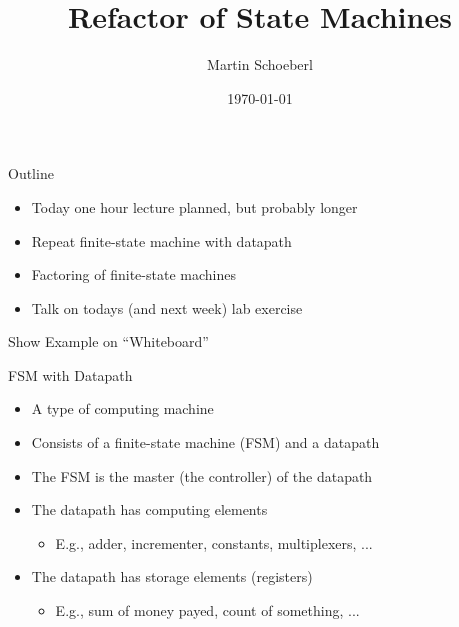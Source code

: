 

\newif\ifbook


\title{Refactor of State Machines}
\author{Martin Schoeberl}
\date{\today}



\begin{frame}
\titlepage
\end{frame}

\begin{frame}[fragile]{Outline}
\begin{itemize}
\item Today one hour lecture planned, but probably longer
\item Repeat finite-state machine with datapath
\item Factoring of finite-state machines
\item Talk on todays (and next week) lab exercise
\end{itemize}
\end{frame}

\begin{frame}[fragile]{Show Example on ``Whiteboard''}
\end{frame}

\begin{frame}[fragile]{FSM with Datapath}
\begin{itemize}
\item A type of computing machine
\item Consists of a finite-state machine (FSM) and a datapath
\item The FSM is the master (the controller) of the datapath
\item The datapath has computing elements
\begin{itemize}
\item E.g., adder, incrementer, constants, multiplexers, ...
\end{itemize}
\item The datapath has storage elements (registers)
\begin{itemize}
\item E.g., sum of money payed, count of something, ...
\end{itemize}
\end{itemize}
\end{frame}

